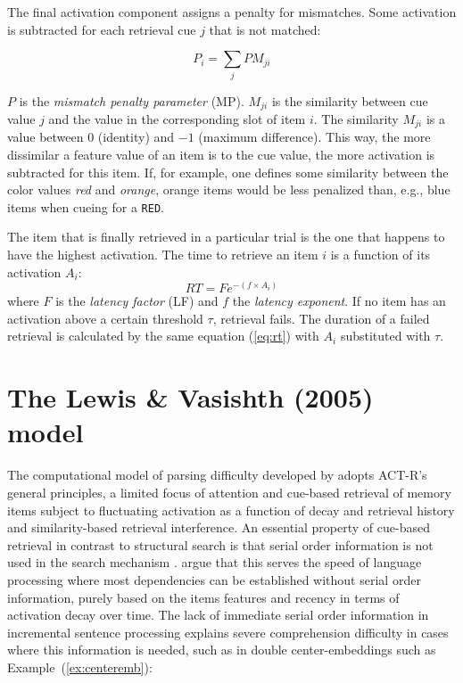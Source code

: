 \documentclass{cambridge7A}\usepackage[]{graphicx}\usepackage[]{color}
\newcommand{\actrcue}[1]{\texttt{\uppercase{#1}}}
\begin{document}
The final activation component assigns a penalty for mismatches. Some activation is subtracted for each retrieval cue $j$ that is not matched:

\begin{equation}\label{eq:pm}
	P_i = \sum_j PM_{ji}
\end{equation}

$P$ is the  \textit{mismatch penalty parameter} (MP). $M_{ji}$ is the similarity between cue value $j$ and the value in the corresponding slot of item $i$. The similarity $M_{ji}$ is a value between $0$ (identity) and $-1$ (maximum difference).
This way, the more dissimilar a feature value of an item is to the cue value, the more activation is subtracted for this item.
If, for example, one defines some similarity between the color values \textit{red} and \textit{orange}, orange items would be less penalized than, e.g., blue items when cueing for a \actrcue{red}.

The item that is finally retrieved in a particular trial is the one that happens to have the highest activation. The time to retrieve an item $i$ is a function of its activation $A_i$:
\begin{equation}\label{eq:rt}
	RT = Fe^{-(f\times A_i)}
\end{equation}
where $F$ is the  \textit{latency factor} (LF) and $f$ the \textit{latency exponent}. 
If no item has an activation above a certain threshold $\tau$, retrieval fails. The duration of a failed retrieval is calculated by the same equation (\ref{eq:rt}) with $A_i$ substituted with $\tau$.


\section{The Lewis \& Vasishth (2005) model}
The  computational model of parsing difficulty developed by \cite{LewisVasishth2005} adopts ACT-R's general principles, a limited focus of attention and cue-based retrieval of memory items subject to fluctuating activation as a function of decay and retrieval history and similarity-based retrieval interference. An essential property of  cue-based retrieval in contrast to structural search is that  serial order information is not used in the search mechanism \citep{McElree2006,Ratcliff1978}. \cite{LewisVasishth2005} argue that this serves the speed of  language processing where most dependencies can be established without serial order information, purely based on the items features and recency in terms of activation decay over time. The lack of immediate serial order information in incremental sentence processing  explains severe comprehension difficulty in cases where this information is needed, such as in double center-embeddings such as Example~(\ref{ex:centeremb}):
\end{document}
